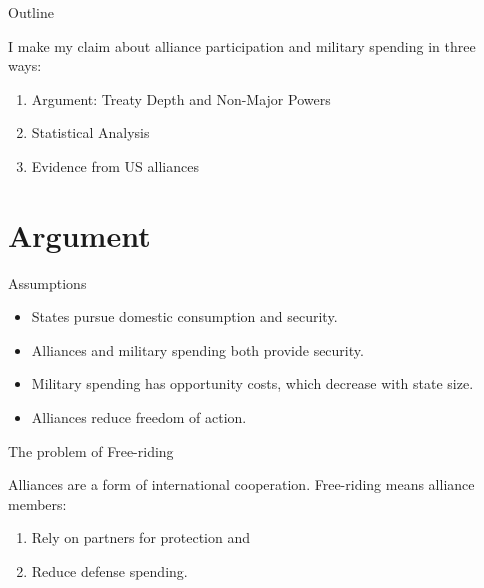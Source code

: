 \documentclass[12pt]{beamer}
\begin{document}

\begin{frame}{Outline}

I make my claim about alliance participation and military spending in three ways: 

\pause
\begin{enumerate}
\item Argument: Treaty Depth and Non-Major Powers
\pause
\item Statistical Analysis
\pause
\item Evidence from US alliances
\end{enumerate}


\end{frame}


\section{Argument}


\begin{frame}{Assumptions}

\begin{itemize} 
\item States pursue domestic consumption and security. 
\pause 
\item Alliances and military spending both provide security.  
\pause 
\item Military spending has opportunity costs, which decrease with state size. 
\pause 
\item Alliances reduce freedom of action.  
\end{itemize}


\end{frame}


\begin{frame}{The problem of Free-riding}

Alliances are a form of international cooperation. Free-riding means alliance members:

\begin{enumerate} 
\pause
\item Rely on partners for protection and  
\pause
\item Reduce defense spending.
\end{enumerate}  

\end{frame}
\end{document}
